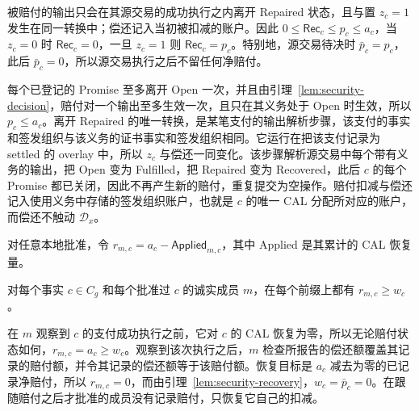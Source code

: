 \begin{lemma}[源交易偿还]
\label{lem:security-recovery}
被赔付的输出只会在其源交易的成功执行之内离开 Repaired 状态，且与置 $z_c=1$ 发生在同一转换中；偿还记入当初被扣减的账户。因此 $0\le\mathsf{Rec}_c\le p_c\le a_c$，当 $z_c=0$ 时 $\mathsf{Rec}_c=0$，一旦 $z_c=1$ 则 $\mathsf{Rec}_c=p_c$。特别地，源交易待决时 $\bar p_c=p_c$，此后 $\bar p_c=0$，所以源交易执行之后不留任何净赔付。
\end{lemma}
\begin{IEEEproof}
每个已登记的 Promise 至多离开 Open 一次，并且由引理~\ref{lem:security-decision}，赔付对一个输出至多生效一次，且只在其义务处于 Open 时生效，所以 $p_c\le a_c$。离开 Repaired 的唯一转换，是某笔支付的输出解析步骤，该支付的事实和签发组织与该义务的证书事实和签发组织相同。它运行在把该支付记录为 settled 的 overlay 中，所以 $z_c$ 与偿还一同变化。该步骤解析源交易中每个带有义务的输出，把 Open 变为 Fulfilled，把 Repaired 变为 Recovered，此后 $c$ 的每个 Promise 都已关闭，因此不再产生新的赔付，重复提交为空操作。赔付扣减与偿还记入使用义务中存储的签发组织账户，也就是 $c$ 的唯一 CAL 分配所对应的账户，而偿还不触动 $\mathcal D_x$。
\end{IEEEproof}

对任意本地批准，令 $r_{m,c}=a_c-\mathsf{Applied}_{m,c}$，其中 Applied 是其累计的 CAL 恢复量。

\begin{lemma}[剩余额度]
\label{lem:security-witness}
对每个事实 $c\in C_g$ 和每个批准过 $c$ 的诚实成员 $m$，在每个前缀上都有
$r_{m,c}\ge w_c$。
\end{lemma}
\begin{IEEEproof}
在 $m$ 观察到 $c$ 的支付成功执行之前，它对 $c$ 的 CAL 恢复为零，所以无论赔付状态如何，$r_{m,c}=a_c\ge w_c$。观察到该次执行之后，$m$ 检查所报告的偿还额覆盖其记录的赔付额，并令其记录的偿还额等于该赔付额。恢复目标是 $a_c$ 减去为零的已记录净赔付，所以 $r_{m,c}=0$，而由引理~\ref{lem:security-recovery}，$w_c=\bar p_c=0$。在跟随赔付之后才批准的成员没有记录赔付，只恢复它自己的扣减。
\end{IEEEproof}

